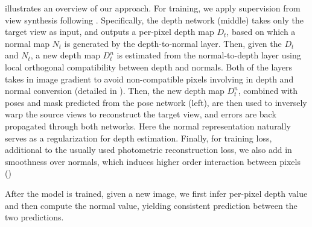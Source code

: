  illustrates an overview of our approach. For training, we apply supervision from view synthesis following \cite{zhou2017unsupervised}. Specifically, the depth network (middle) takes only the target view as input, and
outputs a per-pixel depth map $D_t$, based on which a normal map $N_t$ is generated by the depth-to-normal layer. Then, given the $D_t$ and $N_t$, a new depth map $D_t^n$ is estimated from the normal-to-depth layer using local orthogonal compatibility between depth and normals. Both of the layers takes in image gradient to avoid non-compatible pixels involving in depth and normal conversion (detailed in ).
Then, the new depth map $D_t^n$, combined with poses and mask predicted from the pose network (left), are then used to inversely warp the source views to reconstruct the target view, and errors are back propagated through both networks. Here the normal representation naturally serves as a regularization for depth estimation. Finally, for training loss, additional to the usually used photometric reconstruction loss, we also add in smoothness over normals, which induces higher order interaction between pixels ()

After the model is trained, given a new image,  we first infer per-pixel depth value and then compute the normal value, yielding consistent prediction between the two predictions.




